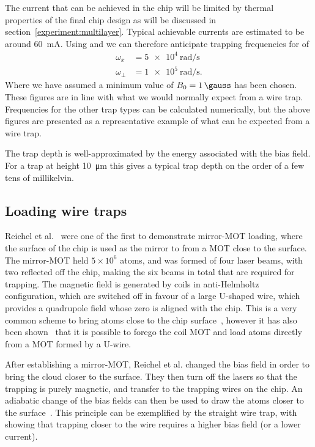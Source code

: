 The current that can be achieved in the chip will be limited by thermal
properties of the final chip design as will be discussed in
section~\ref{experiment:multilayer}. Typical achievable currents are estimated
to be around \SI{60}{\milli\ampere}. 
Using  and
 we can therefore anticipate trapping frequencies
for \CaF of
%
\begin{align}
  \omega_x &= \SI{5e4}{\radian \per \second} \\
  \omega_\perp &= \SI{1e5}{\radian \per \second}.
\end{align}
%
Where we have assumed a minimum value of $B_0 = \SI{1}{\gauss}$ has been chosen.
These figures are in line with what we would normally expect from a wire
trap.~\cite{2011Ac}
Frequencies for the other trap types can be calculated numerically, but the
above figures are presented as a representative example of what can be expected
from a wire trap.

The trap depth is well-approximated by the energy associated with the bias
field. For a trap at height \SI{10}{\micro\metre} this gives a typical trap
depth on the order of a few tens of millikelvin.~\cite{2011Ac}

\subsection{Loading wire traps}

Reichel et al.~\cite{Reichel1999} were one of the first to demonstrate
mirror-MOT loading, where the surface of the chip is used as the mirror to from
a MOT close to the surface. The mirror-MOT held $5\times10^6$ \esRb atoms,
and was formed of four laser beams, with two reflected off the chip, making the
six beams in total that are required for trapping. The magnetic field is
generated by coils in anti-Helmholtz configuration, which are switched off in
favour of a large U-shaped wire, which provides a quadrupole field whose zero is
aligned with the chip. This is a very common scheme to bring atoms close to the
chip surface~\cite{Folman2000, PhysRevLett.97.200405, 2011Ac, Boehi2009},
however it has also been shown~\cite{0256-307X-25-9-034} that it is possible to
forego the coil MOT and load atoms directly from a MOT formed by a U-wire.

After establishing a mirror-MOT, Reichel et al. changed the bias field in order
to bring the cloud closer to the surface. They then turn off the lasers so that
the trapping is purely magnetic, and transfer to the trapping
wires on the chip. An adiabatic change of the bias fields can then be used to
draw the atoms closer to the surface~\cite{Reichel1999, Folman2000}. This
principle can be exemplified by the straight wire trap, with
 showing that trapping closer to the wire requires a
higher bias field (or a lower current).

